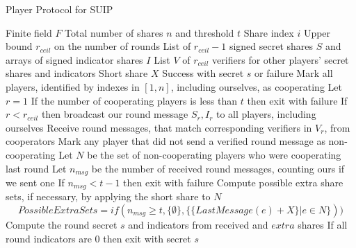 \documentclass{dalcsthesis}
\begin{document}
\begin{algorithm}
  \caption{Player Protocol for SUIP}
  \label{alg:SUI_Player}
  \begin{algorithmic}[1]
    \INPUT Finite field $F$
    \INPUT Total number of shares $n$ and threshold $t$
    \INPUT Share index $i$
    \INPUT Upper bound $r_{ceil}$ on the number of rounds
    \INPUT List of $r_{ceil}-1$ signed secret shares $S$ and arrays of signed indicator shares $I$
    \INPUT List $V$ of $r_{ceil}$ verifiers for other players' secret shares and indicators
    \INPUT Short share $X$
    \OUTPUT Success with secret $s$ or failure
    \STATE Mark all players, identified by indexes in $[1, n]$, including ourselves, as cooperating
    \STATE Let $r = 1$
      \STATE If the number of cooperating players is less than $t$ then exit with failure
      \STATE If $r < r_{ceil}$ then broadcast our round message $S_r, I_r$ to all players, including ourselves
      \STATE Receive round messages, that match corresponding verifiers in $V_r$, from cooperators
      \STATE Mark any player that did not send a verified round message as non-cooperating
      \STATE Let $N$ be the set of non-cooperating players who were cooperating last round
      \STATE Let $n_{msg}$ be the number of received round messages, counting ours if we sent one
      \STATE If $n_{msg} < t - 1$ then exit with failure
      \STATE Compute possible extra share sets, if necessary, by applying the short share to $N$
      		$$PossibleExtraSets = if(n_{msg} \geq t, \{\emptyset\}, \{\{LastMessage(e) + X\} | e \in N\}))$$
        \STATE Compute the round secret $s$ and indicators from received and $extra$ shares
        \STATE If all round indicators are 0 then exit with secret $s$
      \ENDFOR
    \ENDWHILE
  \end{algorithmic}
\end{algorithm}
\end{document}
